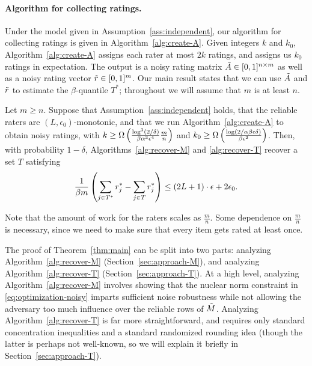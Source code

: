\paragraph{Algorithm for collecting ratings.}
Under the model given in Assumption~\ref{ass:independent}, 
our algorithm for collecting ratings is given in 
Algorithm~\ref{alg:create-A}. Given integers $k$ and $k_0$, 
Algorithm~\ref{alg:create-A} assigns each rater at most $2k$ 
ratings, and assigns us $k_0$ ratings in expectation. The output is a 
noisy rating matrix $\tilde{A} \in [0,1]^{n \times m}$ as well 
as a noisy rating vector $\tilde{r} \in [0,1]^m$.
Our main result states that we can use $\tilde{A}$ and $\tilde{r}$ to 
estimate the $\beta$-quantile $T^*$; throughout we will assume 
that $m$ is at least $n$.
\begin{theorem}
\label{thm:main}
Let $m \geq n$. 
Suppose that Assumption~\ref{ass:independent} holds, that 
the reliable raters are $(L,\epsilon_0)$-monotonic, and 
that we run Algorithm~\ref{alg:create-A} to obtain noisy ratings, 
with $k \geq \Omega\left( \frac{\log^3(2/\delta)}{\beta\alpha^3\epsilon^4}\frac{m}{n} \right)$ and
$k_0 \geq \Omega\left( \frac{\log(2/\alpha\beta\epsilon\delta)}{\beta\epsilon^2} \right)$.
Then, with probability $1-\delta$, 
Algorithms~\ref{alg:recover-M} and \ref{alg:recover-T} recover a set $T$ satisfying 
\vskip -0.18in
\[ \frac{1}{\beta m} \left( \sum_{j \in T^*} r^*_j - \sum_{j \in T} r^*_j \right) 
\leq (2L+1) \cdot \epsilon + 2\epsilon_0. \]
\vskip -0.07in
\end{theorem}
Note that the amount of work for the raters scales as $\frac{m}{n}$. Some dependence 
on $\frac{m}{n}$ is necessary, since we need to make sure that every item gets rated at least once.

The proof of Theorem~\ref{thm:main} can be split into two parts: analyzing 
Algorithm~\ref{alg:recover-M} (Section~\ref{sec:approach-M}), 
and analyzing Algorithm~\ref{alg:recover-T} (Section~\ref{sec:approach-T}). 
At a high level, analyzing Algorithm~\ref{alg:recover-M} involves showing that 
the nuclear norm constraint in \eqref{eq:optimization-noisy} imparts sufficient 
noise robustness while not allowing the adversary too much influence over the 
reliable rows of $\tilde{M}$. Analyzing Algorithm~\ref{alg:recover-T} is far more 
straightforward, 
and requires only standard concentration inequalities and a standard randomized 
rounding idea (though the latter is perhaps not well-known, so we will explain 
it briefly in Section~\ref{sec:approach-T}).

